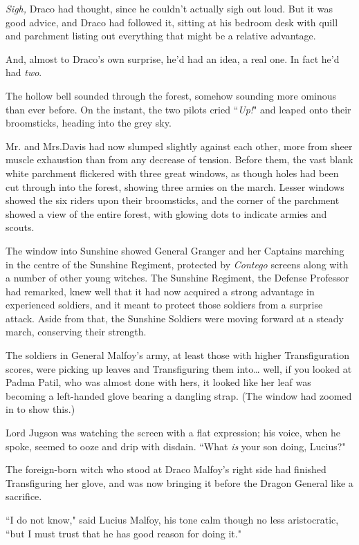 \emph{Sigh,} Draco had thought, since he couldn't actually sigh out loud. But it was good advice, and Draco had followed it, sitting at his bedroom desk with quill and parchment listing out everything that might be a relative advantage.

And, almost to Draco's own surprise, he'd had an idea, a real one. In fact he'd had \emph{two}.

The hollow bell sounded through the forest, somehow sounding more ominous than ever before. On the instant, the two pilots cried ``\emph{Up!}" and leaped onto their broomsticks, heading into the grey sky.

\later

Mr. and Mrs.\?Davis had now slumped slightly against each other, more from sheer muscle exhaustion than from any decrease of tension. Before them, the vast blank white parchment flickered with three great windows, as though holes had been cut through into the forest, showing three armies on the march. Lesser windows showed the six riders upon their broomsticks, and the corner of the parchment showed a view of the entire forest, with glowing dots to indicate armies and scouts.

The window into Sunshine showed General Granger and her Captains marching in the centre of the Sunshine Regiment, protected by \emph{Contego} screens along with a number of other young witches. The Sunshine Regiment, the Defense Professor had remarked, knew well that it had now acquired a strong advantage in experienced soldiers, and it meant to protect those soldiers from a surprise attack. Aside from that, the Sunshine Soldiers were moving forward at a steady march, conserving their strength.

The soldiers in General Malfoy's army, at least those with higher Transfiguration scores, were picking up leaves and Transfiguring them into{\ldots} well, if you looked at Padma Patil, who was almost done with hers, it looked like her leaf was becoming a left-handed glove bearing a dangling strap. (The window had zoomed in to show this.)

Lord Jugson was watching the screen with a flat expression; his voice, when he spoke, seemed to ooze and drip with disdain. ``What \emph{is} your son doing, Lucius?"

The foreign-born witch who stood at Draco Malfoy's right side had finished Transfiguring her glove, and was now bringing it before the Dragon General like a sacrifice.

``I do not know," said Lucius Malfoy, his tone calm though no less aristocratic, ``but I must trust that he has good reason for doing it."


